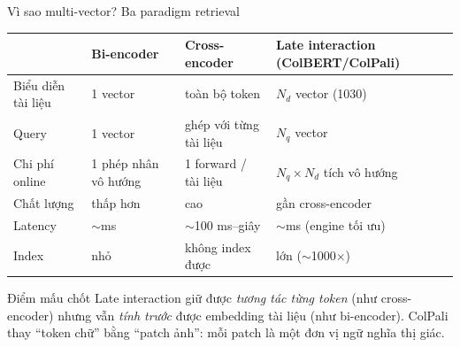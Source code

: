 \documentclass[aspectratio=169,10pt]{beamer}
\begin{document}
\begin{frame}{Vì sao multi-vector? Ba paradigm retrieval}
  \centering
  \footnotesize
  \begin{tabularx}{\textwidth}{@{}lXXX@{}}
    \toprule
     & \textbf{Bi-encoder} & \textbf{Cross-encoder} & \textbf{Late interaction (ColBERT/ColPali)} \\
    \midrule
    Biểu diễn tài liệu & 1 vector & toàn bộ token & $N_d$ vector (1030) \\
    Query & 1 vector & ghép với từng tài liệu & $N_q$ vector \\
    Chi phí online & 1 phép nhân vô hướng & 1 forward / tài liệu & $N_q\times N_d$ tích vô hướng \\
    Chất lượng & thấp hơn & cao & gần cross-encoder \\
    Latency & $\sim$ms & $\sim$100 ms--giây & $\sim$ms (engine tối ưu) \\
    Index & nhỏ & không index được & lớn ($\sim$1000$\times$) \\
    \bottomrule
  \end{tabularx}

  \vspace{4mm}
  \begin{block}{\small Điểm mấu chốt}
    \footnotesize
    Late interaction giữ được \emph{tương tác từng token} (như cross-encoder) nhưng vẫn \emph{tính trước} được embedding tài liệu (như bi-encoder).
    ColPali thay ``token chữ'' bằng ``patch ảnh'': mỗi patch là một đơn vị ngữ nghĩa thị giác.
  \end{block}
\end{frame}
\end{document}
